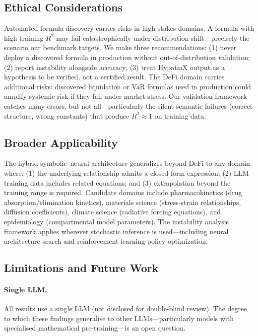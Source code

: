 \documentclass[twoside,11pt]{article}
\newcommand{\Rsq}{R^{2}}
\begin{document}
\subsection{Ethical Considerations}

Automated formula discovery carries risks in high-stakes domains. A formula with high training $\Rsq$ may fail catastrophically under distribution shift---precisely the scenario our benchmark targets. We make three recommendations: (1) never deploy a discovered formula in production without out-of-distribution validation; (2) report instability alongside accuracy; (3) treat HypatiaX output as a hypothesis to be verified, not a certified result. The DeFi domain carries additional risks: discovered liquidation or VaR formulas used in production could amplify systemic risk if they fail under market stress. Our validation framework catches many errors, but not all---particularly the silent semantic failures (correct structure, wrong constants) that produce $\Rsq \approx 1$ on training data.

\subsection{Broader Applicability}

The hybrid symbolic--neural architecture generalizes beyond DeFi to any domain where: (1) the underlying relationship admits a closed-form expression; (2) LLM training data includes related equations; and (3) extrapolation beyond the training range is required. Candidate domains include pharmacokinetics (drug absorption/elimination kinetics), materials science (stress-strain relationships, diffusion coefficients), climate science (radiative forcing equations), and epidemiology (compartmental model parameters). The instability analysis framework applies wherever stochastic inference is used---including neural architecture search and reinforcement learning policy optimization.

\subsection{Limitations and Future Work}
\label{sec:limitations}

\paragraph{Single LLM.}
All results use a single LLM (not disclosed for double-blind review).
The degree to which these findings generalise to other LLMs---particularly
models with specialised mathematical pre-training---is an open question.
\end{document}
